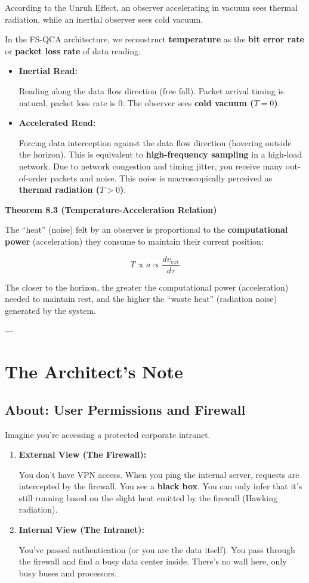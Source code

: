 According to the Unruh Effect, an observer accelerating in vacuum sees thermal radiation, while an inertial observer sees cold vacuum.

In the FS-QCA architecture, we reconstruct \textbf{temperature} as the \textbf{bit error rate} or \textbf{packet loss rate} of data reading.

\begin{itemize}
\item \textbf{Inertial Read:}

    Reading along the data flow direction (free fall). Packet arrival timing is natural, packet loss rate is 0. The observer sees \textbf{cold vacuum ($T=0$)}.

\item \textbf{Accelerated Read:}

    Forcing data interception against the data flow direction (hovering outside the horizon). This is equivalent to \textbf{high-frequency sampling} in a high-load network. Due to network congestion and timing jitter, you receive many out-of-order packets and noise. This noise is macroscopically perceived as \textbf{thermal radiation ($T > 0$)}.
\end{itemize}

\textbf{Theorem 8.3 (Temperature-Acceleration Relation)}

The ``heat'' (noise) felt by an observer is proportional to the \textbf{computational power} (acceleration) they consume to maintain their current position:

$$T \propto a \propto \frac{d v_{ext}}{d\tau}$$

The closer to the horizon, the greater the computational power (acceleration) needed to maintain rest, and the higher the ``waste heat'' (radiation noise) generated by the system.

---

\section{The Architect's Note}

\subsection{About: User Permissions and Firewall}

Imagine you're accessing a protected corporate intranet.

\begin{enumerate}
\item \textbf{External View (The Firewall):}

    You don't have VPN access. When you ping the internal server, requests are intercepted by the firewall. You see a \textbf{black box}. You can only infer that it's still running based on the slight heat emitted by the firewall (Hawking radiation).

\item \textbf{Internal View (The Intranet):}

    You've passed authentication (or you are the data itself). You pass through the firewall and find a busy data center inside. There's no wall here, only busy buses and processors.
\end{enumerate}

